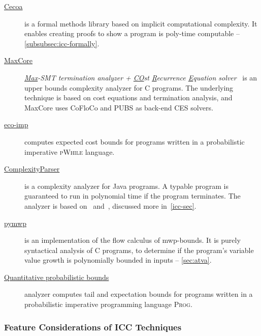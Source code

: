 \begin{description}
\item[\href{https://github.com/davidnowak/cecoa}{Cecoa}]\cite{feree2018}
     is a formal methods library based on implicit computational complexity.
     It enables creating proofs to show a program is poly-time computable -- \autoref{subsubsec:icc-formally}.

\item[\href{https://costa.fdi.ucm.es/maxcore/}{MaxCore}]%
      \emph{\underline{Max}-SMT termination analyzer + \underline{CO}st \underline{R}ecurrence \underline{E}quation solver}~\cite{albert2019}
      is an upper bounds complexity analyzer for C programs.
      The underlying technique is based on cost equations and termination analysis, and MaxCore uses CoFloCo and PUBS as back-end CES solvers.

\item[\href{https://www-sop.inria.fr/members/Martin.Avanzini/software/eco-imp/}{eco-imp}]\cite{avanzini2020}
      computes expected cost bounds for programs written in a probabilistic imperative \textsc{pWhile} language.

\item[\href{https://gitlab.inria.fr/complexityparser/complexityparser}{ComplexityParser}]\cite{hainry2021}
      is a complexity analyzer for Java programs.
      A typable program is guaranteed to run in polynomial time if the program terminates.
      The analyzer is based on~\cite{hainry2015} and~\cite{hainry2018}, discussed more in~\autoref{icc-sec}.

\item[\href{https://github.com/statycc/pymwp}{pymwp}]\cite{aubert2023b}
      is an implementation of the flow calculus of mwp-bounds.
      It is purely syntactical analysis of C programs, to determine if the program's variable value growth is polynomially bounded in inputs -- \autoref{sec:atva}.

\item[\href{https://zenodo.org/records/10457566}{Quantitative probabilistic bounds}]\cite{chatterjee2024}
      analyzer computes tail and expectation bounds for programs written
      in a probabilistic imperative programming language \textsc{Prog}.

\end{description}

\subsubsection{Feature Considerations of ICC Techniques}\label{icc-feat}

